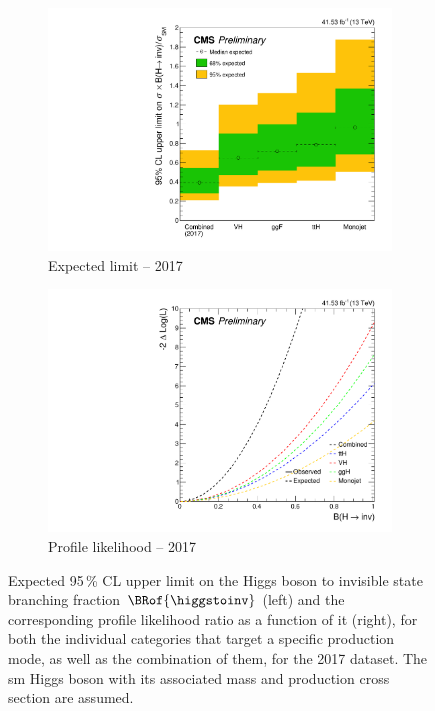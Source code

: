 \begin{figure}[htbp]
    \centering
    \begin{subfigure}[b]{0.45\textwidth}
        \includegraphics[width=\textwidth]{figures/limits/limit_2017_comb_Scenario4.pdf}
        \caption{Expected limit -- 2017}
    \end{subfigure}
    \hspace{0.05\textwidth}
    \begin{subfigure}[b]{0.45\textwidth}
        \includegraphics[width=\textwidth]{figures/likelihood_scan/profile_likelihood_scan_2017_Scenario4.pdf}
        \caption{Profile likelihood -- 2017}
    \end{subfigure}
    \caption[Expected 95\,\% CL upper limit on the Higgs boson to invisible state branching fraction $\BRof{\higgstoinv}$ and the corresponding profile likelihood ratio as a function of it, for both the individual categories that target a specific production mode, as well as the combination of them, for the 2017 dataset]{Expected 95\,\% CL upper limit on the Higgs boson to invisible state branching fraction $\BRof{\higgstoinv}$ (left) and the corresponding profile likelihood ratio as a function of it (right), for both the individual categories that target a specific production mode, as well as the combination of them, for the 2017 dataset. The \acrlong{sm} Higgs boson with its associated mass and production cross section are assumed.}
    \label{fig:htoinv_limit_likelihood_2017}
\end{figure}

